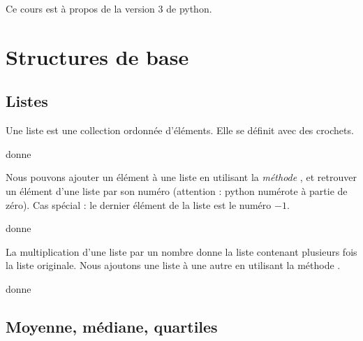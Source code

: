 
Ce cours est à propos de la version \( 3\) de python.

\chapter{Structures de base}

\section{Listes}

Une liste est une collection ordonnée d'éléments. Elle se définit avec des crochets.



donne



Nous pouvons ajouter un élément à une liste en utilisant la \emph{méthode} , et retrouver un élément d'une liste par son numéro (attention : python numérote à partie de zéro). Cas spécial : le dernier élément de la liste est le numéro \( -1\).



donne



La multiplication d'une liste par un nombre donne la liste contenant plusieurs fois la liste originale. Nous ajoutons une liste à une autre en utilisant la méthode .




donne




\section{Moyenne, médiane, quartiles}

